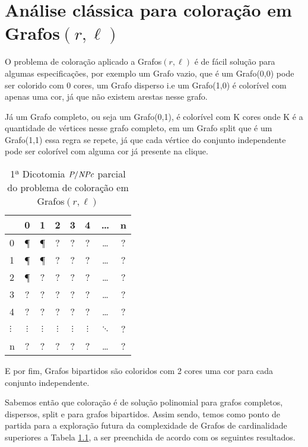 \chapter{Análise clássica para coloração em Grafos$(r,\ell)$}

O problema de coloração aplicado a Grafos$(r,\ell)$ é de fácil solução para algumas especificações,
por exemplo um Grafo vazio, que é um Grafo(0,0) pode ser colorido com 0 cores, um Grafo disperso i.e um Grafo(1,0) é colorível com apenas uma cor, já que não existem arestas nesse grafo.

Já um Grafo completo, ou seja um Grafo(0,1), é colorível com K cores onde K é a quantidade de vértices nesse grafo completo, em um Grafo split que é um Grafo(1,1) essa regra se repete, já que cada vértice do conjunto independente pode ser colorível com alguma cor já presente na clique.

\begin{table}[!htb]
	\center
	\begin{tabular}{l|*{7}c}
		\toprule
		\backslashbox{$r$}{$l$} & 0 & 1 & 2 & 3 & 4 & \ldots & n\\
		\midrule
		0 & \P & \P & ? & ? & ? & \ldots & ?\\
		1 & \P & \P & ? & ? & ? & \ldots & ?\\
		2 & \P & ? & ? & ? & ? & \ldots & ?\\
		3 & ? & ? & ? & ? & ? & \ldots & ?\\
		4 & ? & ? & ? & ? & ? & \ldots & ?\\
		$\vdots$ & $\vdots$ & $\vdots$ & $\vdots$ & $\vdots$ & $\vdots$ & $\ddots$ & ?\\
		n & ? & ? & ? & ? & ? & \ldots & ?\\
		\bottomrule
	\end{tabular}%
	\caption{1ª Dicotomia $\textit{P}/\textit{NPc}$ parcial do problema de coloração em Grafos$(r,\ell)$}
	\label{tab:tabela_part1dictrl}%
\end{table}%

E por fim, Grafos bipartidos são coloridos com 2 cores uma cor para cada conjunto independente.

Sabemos então que coloração é de solução polinomial para grafos completos, dispersos, split e para grafos bipartidos. Assim sendo, temos como ponto de partida para a exploração futura da complexidade de Grafos de cardinalidade superiores a Tabela \ref{tab:tabela_part1dictrl}, a ser preenchida de acordo com os seguintes resultados.

